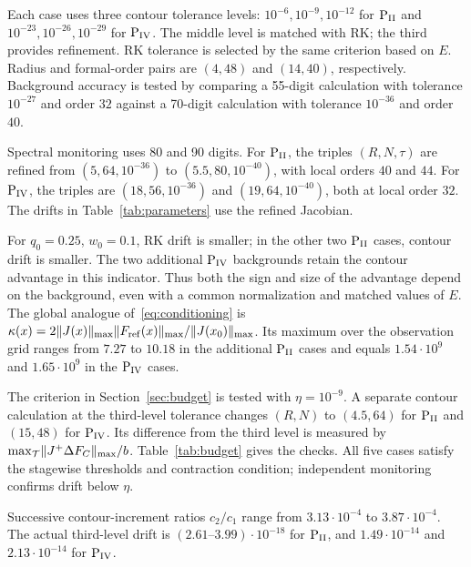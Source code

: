 Each case uses three contour tolerance levels:
$10^{-6},10^{-9},10^{-12}$ for $\PII$ and
$10^{-23},10^{-26},10^{-29}$ for $\PIV$.
The middle level is matched with RK; the third provides refinement.
RK tolerance is selected by the same criterion based on $E$.
Radius and formal-order pairs are $(4,48)$ and $(14,40)$, respectively.
Background accuracy is tested by comparing a 55-digit calculation with
tolerance $10^{-27}$ and order $32$ against a 70-digit calculation
with tolerance $10^{-36}$ and order $40$.

Spectral monitoring uses 80 and 90 digits. For $\PII$, the triples
$(R,N,\tau)$ are refined from $(5,64,10^{-36})$ to
$(5.5,80,10^{-40})$, with local orders $40$ and $44$.
For $\PIV$, the triples are $(18,56,10^{-36})$ and
$(19,64,10^{-40})$, both at local order $32$.
The drifts in Table~\ref{tab:parameters} use the refined Jacobian.
\begin{table}[htbp]\centering\footnotesize
\setlength{\tabcolsep}{3pt}
\caption{Additional cases with matched solution errors. The first three
rows concern $\PII$, and the last two concern $\PIV$.}
\label{tab:parameters}

\end{table}
\FloatBarrier
For $q_0=0.25$, $w_0=0.1$, RK drift is smaller; in the other two
$\PII$ cases, contour drift is smaller. The two additional $\PIV$
backgrounds retain the contour advantage in this indicator.
Thus both the sign and size of the advantage depend on the background,
even with a common normalization and matched values of $E$.
The global analogue of~\eqref{eq:conditioning} is
$\kappa(x)=2\lVert J(x)\rVert_{\max}\lVert F_{\rm ref}(x)\rVert_{\max}/\lVert J(x_0)\rVert_{\max}$.
Its maximum over the observation grid ranges from $7.27$ to $10.18$
in the additional $\PII$ cases and equals $1.54\cdot10^9$ and
$1.65\cdot10^9$ in the $\PIV$ cases.

The criterion in Section~\ref{sec:budget} is tested with $\eta=10^{-9}$.
A separate contour calculation at the third-level tolerance changes
$(R,N)$ to $(4.5,64)$ for $\PII$ and $(15,48)$ for $\PIV$.
Its difference from the third level is measured by
$\max_{\mathcal T}\lVert J^+\Delta F_C\rVert_{\max}/b$.
Table~\ref{tab:budget} gives the checks. All five cases satisfy the
stagewise thresholds and contraction condition; independent monitoring
confirms drift below $\eta$.
\begin{table}[htbp]\centering\footnotesize
\setlength{\tabcolsep}{3pt}
\caption{Stagewise refinement in normalized-drift units.}
\label{tab:budget}

\end{table}
\FloatBarrier
Successive contour-increment ratios $c_2/c_1$ range from
$3.13\cdot10^{-4}$ to $3.87\cdot10^{-4}$.
The actual third-level drift is $(2.61\text{--}3.99)\cdot10^{-18}$
for $\PII$, and $1.49\cdot10^{-14}$ and $2.13\cdot10^{-14}$ for $\PIV$.

